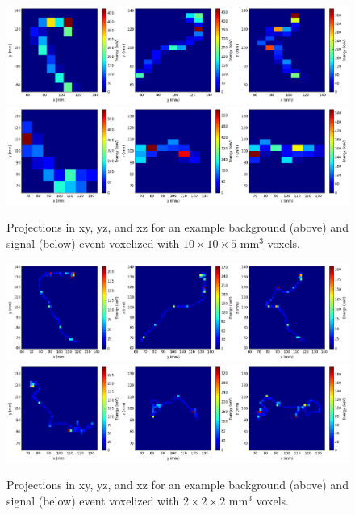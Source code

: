 \documentclass[a4paper,11pt]{article}
\begin{document}
\begin{figure}[!htb]
	\centering
	\includegraphics[scale=0.36]{fig/plt_h2D_dnn_NEXT100_Bi214_bg_v10x10x5_r200x200x200_6_bg.png}
	\includegraphics[scale=0.36]{fig/plt_h2D_dnn_NEXT100_0vbb_si_v10x10x5_r200x200x200_6_si.png}
	\caption{\label{fig.exampleProjs10105}Projections in xy, yz, and xz for an example background (above) and signal (below) event voxelized with $10 \times 10 \times 5$ mm$^3$ voxels.}
\end{figure}

\begin{figure}[!htb]
	\centering
	\includegraphics[scale=0.36]{fig/plt_h2D_dnn_NEXT100_Bi214_bg_v2x2x2_r200x200x200_2_bg.png}
	\includegraphics[scale=0.36]{fig/plt_h2D_dnn_NEXT100_0vbb_si_v2x2x2_r200x200x200_4_si.png}
	\caption{\label{fig.exampleProjs222}Projections in xy, yz, and xz for an example background (above) and signal (below) event voxelized with $2 \times 2 \times 2$ mm$^3$ voxels.}
\end{figure}
\end{document}
